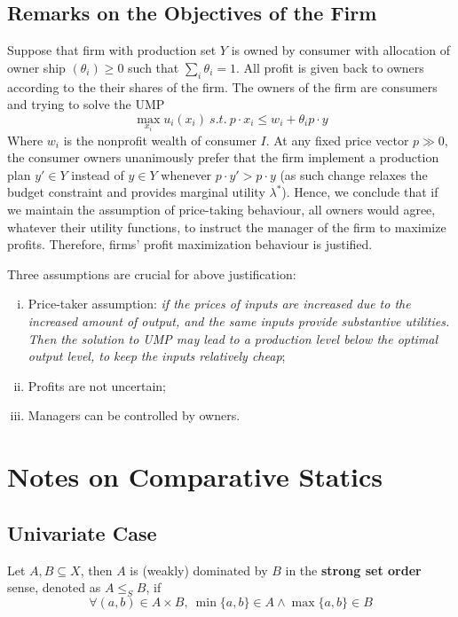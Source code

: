 \documentclass{report}
\begin{document}
	 	\subsection{Remarks on the Objectives of the Firm}
	 		\begin{remark}
	 			Suppose that firm with production set $Y$ is owned by consumer with allocation of owner ship $(\theta_i) \geq 0$ such that $\sum_i \theta_i = 1$. All profit is given back to owners according to the their shares of the firm. The owners of the firm are consumers and trying to solve the UMP
	 			\begin{equation}
	 				\max_{x_i} u_i(x_i)\ s.t.\ p \cdot x_i \leq w_i + \theta_i p \cdot y
	 			\end{equation}
	 			Where $w_i$ is the nonprofit wealth of consumer $I$. At any fixed price vector $p \gg 0$, the consumer owners unanimously prefer that the firm implement a production plan $y' \in Y$ instead of $y \in Y$ whenever $p\cdot y' > p\cdot y$ (as such change relaxes the budget constraint and provides marginal utility $\lambda^*$). Hence, we conclude that if we maintain the assumption of price-taking behaviour, all owners would agree, whatever their utility functions, to instruct the manager of the firm to maximize profits. Therefore, firms' profit maximization behaviour is justified.
	 		\end{remark}
	 		
	 		\begin{remark}
	 			Three assumptions are crucial for above justification:
	 			\begin{enumerate}[(i)]
	 				\item Price-taker assumption: \emph{if the prices of inputs are increased due to the increased amount of output, and the same inputs provide substantive utilities. Then the solution to UMP may lead to a production level below the optimal output level, to keep the inputs relatively cheap};   
	 				\item Profits are not uncertain;
	 				\item Managers can be controlled by owners.
	 			\end{enumerate}
	 		\end{remark}
	 		
	\section{Notes on Comparative Statics}
		\subsection{Univariate Case}
			\begin{definition}
				Let $A, B \subseteq X$, then $A$ is (weakly) dominated by $B$ in the \textbf{strong set order} sense, denoted as $A \leq_S B$, if 
				\begin{equation}
					\forall (a, b) \in A \times B,\ \min\{a, b\} \in A \land \max\{a, b\} \in B
				\end{equation}
			\end{definition}
			
\end{document}
